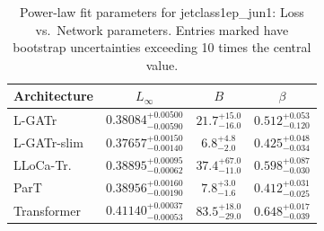 \begin{table}[h]
  \centering
  \begin{tabular}{lccc}
    \toprule
    Architecture & $L_\infty$ & $B$ & $\beta$ \\
    \midrule
    L-GATr & $0.38084^{+0.00500}_{-0.00590}$ & $21.7^{+15.0}_{-16.0}$ & $0.512^{+0.053}_{-0.120}$ \\
    L-GATr-slim & $0.37657^{+0.00150}_{-0.00140}$ & $6.8^{+4.8}_{-2.0}$ & $0.425^{+0.048}_{-0.034}$ \\
    LLoCa-Tr. & $0.38895^{+0.00095}_{-0.00062}$ & $37.4^{+67.0}_{-11.0}$ & $0.598^{+0.087}_{-0.030}$ \\
    ParT & $0.38956^{+0.00160}_{-0.00190}$ & $7.8^{+3.0}_{-1.6}$ & $0.412^{+0.031}_{-0.025}$ \\
    Transformer & $0.41140^{+0.00037}_{-0.00053}$ & $83.5^{+18.0}_{-29.0}$ & $0.648^{+0.017}_{-0.039}$ \\
    \bottomrule
  \end{tabular}
  \caption{Power-law fit parameters for jetclass1ep\_jun1: Loss vs.\ Network parameters. Entries marked \textemdash{} have bootstrap uncertainties exceeding 10 times the central value.}
  \label{tab:jetclass1ep_jun1}
\end{table}
